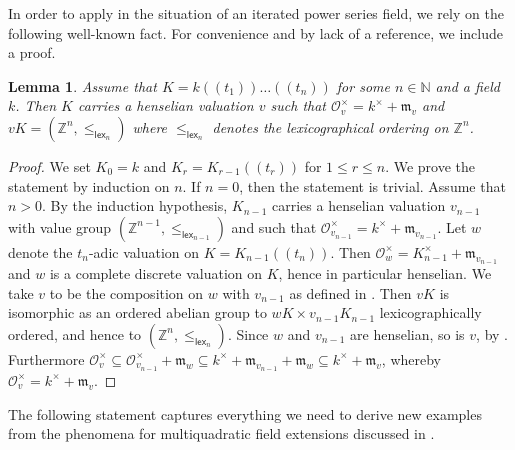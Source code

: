 \documentclass[twoside,11pt]{amsart}
\numberwithin{equation}{section}
\newtheorem{lem}[equation]{Lemma}
\theoremstyle{definition}
\newcommand{\mg}[1]{{#1}^{\times}}
\newcommand{\nat}{\mathbb{N}}
\renewcommand{\leq}{\leqslant}
\newcommand{\mc}{\mathcal}
\renewcommand{\leq}{\leqslant}
\newcommand{\mf}{\mathfrak}
\newcommand{\mfm}{\mf{m}}
\newcommand{\zz}{\mathbb{Z}}
\begin{document}
In order to apply  in the situation of an iterated power series field, we rely on the following well-known fact.
For convenience and by lack of a reference, we include a proof.


\begin{lem}\label{P:itpowser-hensval}
    Assume that $K=k(\!(t_1)\!)\ldots(\!(t_n)\!)$ for some $n\in\nat$ and a field $k$.
    Then $K$ carries a henselian valuation $v$ such that $\mg{\mc{O}}_v=\mg{k}+\mfm_v$ and $vK=(\zz^n,\leq_{\mathsf{lex}_n})$ where $\leq_{\mathsf{lex}_n}$ denotes the lexicographical ordering on $\zz^n$.
\end{lem}
\begin{proof}
    We set $K_0=k$ and $K_r=K_{r-1}(\!(t_r)\!)$ for $1\leq r\leq n$.
    We prove the statement by induction on $n$.
    If $n=0$, then the statement is trivial. 
    Assume that $n>0$. By the induction hypothesis, $K_{n-1}$ carries a henselian valuation $v_{n-1}$ with value group $(\zz^{n-1},\leq_{\mathsf{lex}_{n-1}})$ and such that $\mg{\mc{O}}_{v_{n-1}}=\mg{k}+\mfm_{v_{n-1}}$.
    Let $w$ denote the $t_n$-adic valuation on $K=K_{n-1}(\!(t_n)\!)$.
    Then $\mg{\mc{O}}_w=\mg{K}_{n-1}+\mfm_{v_{n-1}}$ and $w$ is a complete discrete valuation on $K$, hence in particular henselian.
    We take $v$ to be the composition on $w$ with $v_{n-1}$ as defined in \cite[Sect.~2.3]{EP05}.
    Then $vK$ is isomorphic as an ordered abelian group to $wK\times v_{n-1}K_{n-1}$ lexicographically ordered, and hence to $(\zz^n,\leq_{\mathsf{lex}_n})$.
    Since $w$ and $v_{n-1}$ are henselian, so is $v$, by \cite[Cor.~4.1.4]{EP05}.
    Furthermore $\mg{\mc{O}}_v\subseteq \mg{\mc{O}}_{v_{n-1}}+\mfm_w
    \subseteq \mg{k}+\mfm_{v_{n-1}}+\mfm_{w}\subseteq\mg{k}+\mfm_v$, whereby $\mg{\mc{O}}_v=\mg{k}+\mfm_{v}$.
\end{proof}

The following statement captures everything we need to derive new examples from the phenomena for multiquadratic field extensions discussed in .
\end{document}
